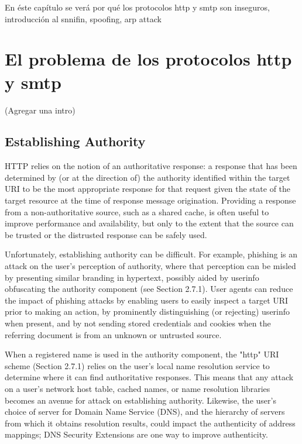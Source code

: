 
En éste capítulo se verá por qué los protocolos http y smtp son inseguros, introducción al snnifin, spoofing, arp attack

\section{El problema de los protocolos http y smtp}


(Agregar una intro)

\subsection{Establishing Authority}

HTTP relies on the notion of an authoritative response: a response
that has been determined by (or at the direction of) the authority
identified within the target URI to be the most appropriate response
for that request given the state of the target resource at the time
of response message origination.  Providing a response from a
non-authoritative source, such as a shared cache, is often useful to
improve performance and availability, but only to the extent that the
source can be trusted or the distrusted response can be safely used.

Unfortunately, establishing authority can be difficult.  For example,
phishing is an attack on the user's perception of authority, where
that perception can be misled by presenting similar branding in
hypertext, possibly aided by userinfo obfuscating the authority
component (see Section 2.7.1).  User agents can reduce the impact of
phishing attacks by enabling users to easily inspect a target URI
prior to making an action, by prominently distinguishing (or
rejecting) userinfo when present, and by not sending stored
credentials and cookies when the referring document is from an
unknown or untrusted source.

When a registered name is used in the authority component, the "http"
URI scheme (Section 2.7.1) relies on the user's local name resolution
service to determine where it can find authoritative responses.  This
means that any attack on a user's network host table, cached names,
or name resolution libraries becomes an avenue for attack on
establishing authority.  Likewise, the user's choice of server for
Domain Name Service (DNS), and the hierarchy of servers from which it
obtains resolution results, could impact the authenticity of address
mappings; DNS Security Extensions are one way to
improve authenticity.

